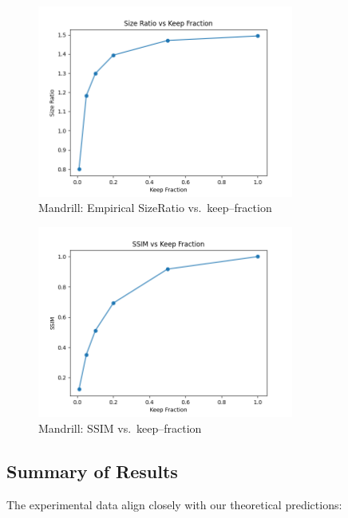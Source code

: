 \documentclass[12pt]{article}
\begin{document}
\begin{figure}[H]
  \centering
  \includegraphics[width=0.75\textwidth]{size_ratio_vs_keep_Mandrill.png}
  \caption{Mandrill: Empirical SizeRatio vs.\ keep–fraction}
\end{figure}

\begin{figure}[H]
  \centering
  \includegraphics[width=0.75\textwidth]{ssim_vs_keep_Mandrill.png}
  \caption{Mandrill: SSIM vs.\ keep–fraction}
\end{figure}

\subsection{Summary of Results}
The experimental data align closely with our theoretical predictions:
\end{document}
